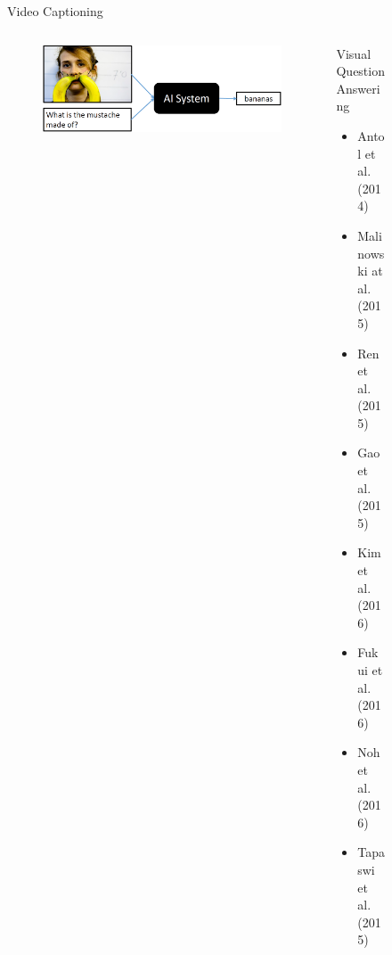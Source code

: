 \documentclass{beamer}
\begin{document}
\begin{frame}
\begin{figure}
\begin{minipage}[t][7cm][t]{\textwidth}
\begin{overprint}
\begin{columns}
\begin{column}{0.4\textwidth}
\begin{block}{Video Captioning
								}
\begin{itemize}
								\end{itemize}
							\end{block}
						\end{column}
					\end{columns}
					\begin{columns}
						\begin{column}{0.6\textwidth}
							\begin{figure}[ht]
								\centering
								\includegraphics[width=1\linewidth]{images/visualQA.png}
								\label{fig:vqa}
								
							\end{figure}
						\end{column}
						\begin{column}{0.4\textwidth}
							\begin{block}{Visual Question Answering
								}
								\begin{itemize}
									\item Antol et al. (2014) 
									\item Malinowski at al. (2015)
									\item Ren et al. (2015)
									\item Gao et al. (2015)
									\item Kim et al. (2016)
									\item Fukui et al. (2016)
									\item Noh et al. (2016)
									\item Tapaswi et al. (2015)
								\end{itemize}
							\end{block}
						\end{column}
					\end{columns}
					
					\onslide<12>
					
					\begin{columns}
						\begin{column}{0.6\textwidth}
							

\end{column}
\end{columns}
\end{overprint}
\end{minipage}
\end{figure}
\end{frame}
\end{document}
